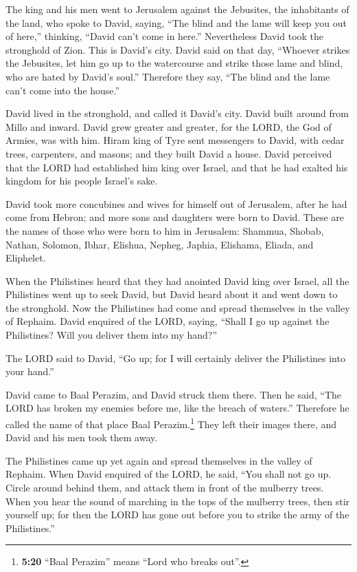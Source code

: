  The king and his men went to Jerusalem against the
Jebusites, the inhabitants of the land, who spoke to David, saying,
``The blind and the lame will keep you out of here,'' thinking, ``David
can't come in here.''  Nevertheless David took the
stronghold of Zion. This is David's city.  David said on
that day, ``Whoever strikes the Jebusites, let him go up to the
watercourse and strike those lame and blind, who are hated by David's
soul.'' Therefore they say, ``The blind and the lame can't come into the
house.''

 David lived in the stronghold, and called it David's
city. David built around from Millo and inward.  David
grew greater and greater, for the LORD, the God of Armies, was with him.
 Hiram king of Tyre sent messengers to David, with cedar
trees, carpenters, and masons; and they built David a house.
 David perceived that the LORD had established him king
over Israel, and that he had exalted his kingdom for his people Israel's
sake.

 David took more concubines and wives for himself out of
Jerusalem, after he had come from Hebron; and more sons and daughters
were born to David.  These are the names of those who
were born to him in Jerusalem: Shammua, Shobab, Nathan, Solomon,
 Ibhar, Elishua, Nepheg, Japhia, 
Elishama, Eliada, and Eliphelet.

 When the Philistines heard that they had anointed David
king over Israel, all the Philistines went up to seek David, but David
heard about it and went down to the stronghold.  Now the
Philistines had come and spread themselves in the valley of Rephaim.
 David enquired of the LORD, saying, ``Shall I go up
against the Philistines? Will you deliver them into my hand?''

The LORD said to David, ``Go up; for I will certainly deliver the
Philistines into your hand.''

 David came to Baal Perazim, and David struck them there.
Then he said, ``The LORD has broken my enemies before me, like the
breach of waters.'' Therefore he called the name of that place Baal
Perazim.\footnote{\textbf{5:20} ``Baal Perazim'' means ``Lord who breaks
  out''.}  They left their images there, and David and
his men took them away.

 The Philistines came up yet again and spread themselves
in the valley of Rephaim.  When David enquired of the
LORD, he said, ``You shall not go up. Circle around behind them, and
attack them in front of the mulberry trees.  When you
hear the sound of marching in the tops of the mulberry trees, then stir
yourself up; for then the LORD has gone out before you to strike the
army of the Philistines.''


